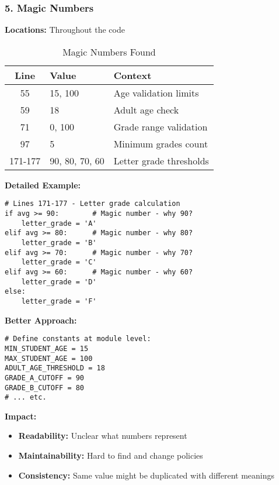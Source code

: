 \documentclass[11pt,a4paper]{article}
\begin{document}
\subsubsection{5. Magic Numbers}

\textbf{Locations:} Throughout the code

\begin{table}[h]
\centering
\caption{Magic Numbers Found}
\begin{tabular}{@{}clp{5cm}@{}}
\toprule
\textbf{Line} & \textbf{Value} & \textbf{Context} \\
\midrule
55 & 15, 100 & Age validation limits \\
59 & 18 & Adult age check \\
71 & 0, 100 & Grade range validation \\
97 & 5 & Minimum grades count \\
171-177 & 90, 80, 70, 60 & Letter grade thresholds \\
\bottomrule
\end{tabular}
\end{table}

\textbf{Detailed Example:}
\begin{lstlisting}[caption={Magic Numbers in Grade Calculation}]
# Lines 171-177 - Letter grade calculation
if avg >= 90:        # Magic number - why 90?
    letter_grade = 'A'
elif avg >= 80:      # Magic number - why 80?
    letter_grade = 'B'
elif avg >= 70:      # Magic number - why 70?
    letter_grade = 'C'
elif avg >= 60:      # Magic number - why 60?
    letter_grade = 'D'
else:
    letter_grade = 'F'
\end{lstlisting}

\textbf{Better Approach:}
\begin{lstlisting}[caption={Using Named Constants}]
# Define constants at module level:
MIN_STUDENT_AGE = 15
MAX_STUDENT_AGE = 100
ADULT_AGE_THRESHOLD = 18
GRADE_A_CUTOFF = 90
GRADE_B_CUTOFF = 80
# ... etc.
\end{lstlisting}

\textbf{Impact:}
\begin{itemize}[noitemsep]
    \item \textbf{Readability:} Unclear what numbers represent
    \item \textbf{Maintainability:} Hard to find and change policies
    \item \textbf{Consistency:} Same value might be duplicated with different meanings
\end{itemize}
\end{document}
